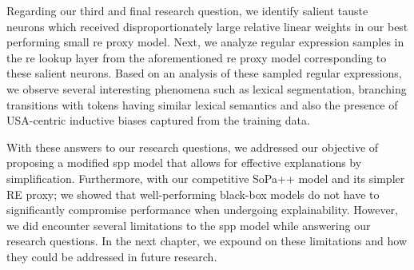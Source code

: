Regarding our third and final research question, we identify salient \ac{tauste}
neurons which received disproportionately large relative linear weights in our
best performing small \ac{re} proxy model. Next, we analyze regular expression
samples in the \ac{re} lookup layer from the aforementioned \ac{re} proxy model
corresponding to these salient neurons. Based on an analysis of these sampled
regular expressions, we observe several interesting phenomena such as lexical
segmentation, branching transitions with tokens having similar lexical semantics
and also the presence of USA-centric inductive biases captured from the training
data.

\clearpage

With these answers to our research questions, we addressed our objective of
proposing a modified \ac{spp} model that allows for effective explanations by
simplification. Furthermore, with our competitive SoPa++ model and its simpler
RE proxy; we showed that well-performing black-box models do not have to
significantly compromise performance when undergoing explainability. However, we
did encounter several limitations to the \ac{spp} model while answering our
research questions. In the next chapter, we expound on these limitations and how
they could be addressed in future research.



